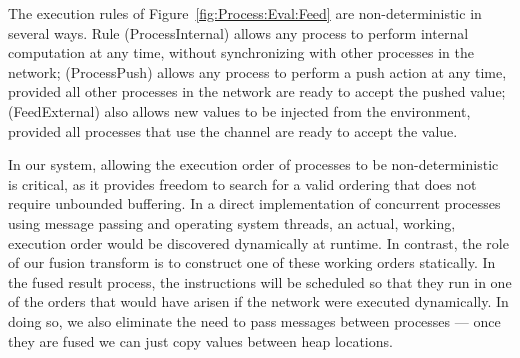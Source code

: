 The execution rules of Figure~\ref{fig:Process:Eval:Feed} are non-deterministic in several ways. Rule (ProcessInternal) allows any process to perform internal computation at any time, without synchronizing with other processes in the network; (ProcessPush) allows any process to perform a push action at any time, provided all other processes in the network are ready to accept the pushed value; (FeedExternal) also allows new values to be injected from the environment, provided all processes that use the channel are ready to accept the value.

In our system, allowing the execution order of processes to be non-deterministic is critical, as it provides freedom to search for a valid ordering that does not require unbounded buffering.
In a direct implementation of concurrent processes using message passing and operating system threads, an actual, working, execution order would be discovered dynamically at runtime. In contrast, the role of our fusion transform is to construct one of these working orders statically. In the fused result process, the instructions will be scheduled so that they run in one of the orders that would have arisen if the network were executed dynamically. In doing so, we also eliminate the need to pass messages between processes --- once they are fused we can just copy values between heap locations.

